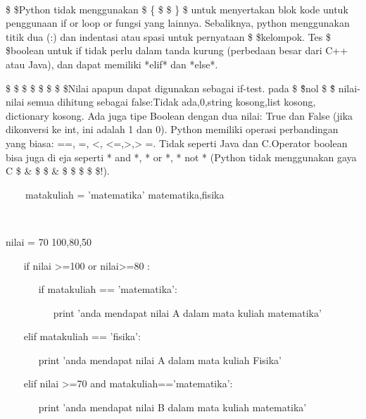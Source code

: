 \noindent 
~~~  \par
\vspace{12pt}
\noindent 
 \$ \$Python tidak menggunakan \$ \{ \$ \$ \} \$ untuk menyertakan blok kode untuk penggunaan if or loop or fungsi yang lainnya. Sebaliknya, python menggunakan titik dua (:) dan indentasi atau spasi untuk pernyataan \$ \$kelompok. Tes \$ \$boolean untuk if tidak perlu dalam tanda kurung (perbedaan besar dari C++ atau Java), dan dapat memiliki *elif* dan *else*. \par
\noindent 
\vspace{\baselineskip}
 \$  \$ \$  \$ \$  \$ \$  \$Nilai apapun dapat digunakan sebagai if-test. pada  \$ \" \$nol \$ \" \$ nilai-nilai semua dihitung sebagai false:Tidak ada,0,string kosong,list kosong, dictionary kosong. Ada juga tipe Boolean dengan dua nilai: True dan False (jika dikonversi ke int, ini adalah 1 dan 0). Python memiliki operasi perbandingan yang biasa: ==, =, <, <=,>,> =. Tidak seperti Java dan C.Operator boolean bisa juga di eja seperti * and *, * or *, * not * (Python tidak menggunakan gaya C  \$  \&  \$  \$  \&  \$  \$  \vert  \$  \$  \vert  \$!). \par
\vspace{12pt}
\noindent 
~~~~matakuliah = 'matematika'   matematika,fisika \par
\noindent 
~~  \par
\noindent 
 nilai = 70 100,80,50 \par
\vspace{12pt}
\noindent 
~~~ if nilai >=100 or nilai>=80 : \par
\vspace{12pt}
\noindent 
~~~~~~ if matakuliah == 'matematika': \par
\vspace{12pt}
\noindent 
~~~~~~~~~ print 'anda mendapat nilai A dalam mata kuliah matematika' \par
\vspace{12pt}
\noindent 
~~~ elif matakuliah == 'fisika': \par
\vspace{12pt}
\noindent 
~~~~~~ print 'anda mendapat nilai A dalam mata kuliah Fisika' \par
\vspace{12pt}
\noindent 
~~~ elif nilai >=70 and matakuliah=='matematika': \par
\vspace{12pt}
\vspace{12pt}
\noindent 
~~~~~~ print 'anda mendapat nilai B dalam mata kuliah matematika' \par
